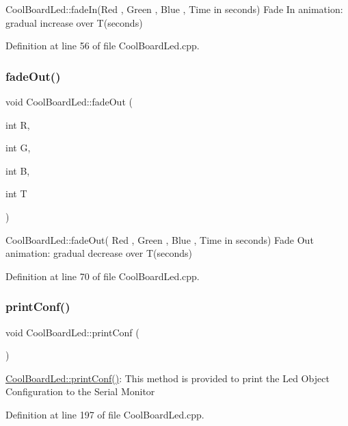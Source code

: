 Cool\+Board\+Led\+::fade\+In(\+Red , Green , Blue , Time in seconds) Fade In animation\+: gradual increase over T(seconds) 

Definition at line 56 of file Cool\+Board\+Led.\+cpp.

\mbox{\label{class_cool_board_led_a27c4e14fa2cd3639c0844152cea98887}} 
\subsubsection{\texorpdfstring{fade\+Out()}{fadeOut()}}
{\footnotesize\ttfamily void Cool\+Board\+Led\+::fade\+Out (\begin{DoxyParamCaption}\item[{int}]{R,  }\item[{int}]{G,  }\item[{int}]{B,  }\item[{int}]{T }\end{DoxyParamCaption})}

Cool\+Board\+Led\+::fade\+Out( Red , Green , Blue , Time in seconds) Fade Out animation\+: gradual decrease over T(seconds) 

Definition at line 70 of file Cool\+Board\+Led.\+cpp.

\mbox{\label{class_cool_board_led_a8ed3053a36f0ed4a131f43b5b17efb61}} 
\subsubsection{\texorpdfstring{print\+Conf()}{printConf()}}
{\footnotesize\ttfamily void Cool\+Board\+Led\+::print\+Conf (\begin{DoxyParamCaption}{ }\end{DoxyParamCaption})}

\hyperlink{class_cool_board_led_a8ed3053a36f0ed4a131f43b5b17efb61}{Cool\+Board\+Led\+::print\+Conf()}\+: This method is provided to print the Led Object Configuration to the Serial Monitor 

Definition at line 197 of file Cool\+Board\+Led.\+cpp.


